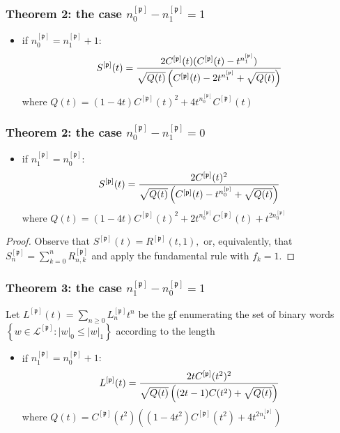 \documentclass{beamer}
\begin{document}
\begin{frame}\frametitle{Theorem 2: the case $n_0^{[\mathfrak{p}]}-n_1^{[\mathfrak{p}]}=1$}
\begin{itemize}
\item if $n_0^{[\mathfrak{p}]}=n_1^{[\mathfrak{p}]}+1:$
$$S^{[\mathfrak{p}]}(t)={2C^{[\mathfrak{p}]}(t)(C^{[\mathfrak{p}]}(t)-t^{n_1^{[\mathfrak{p}]}}
) \over \sqrt{Q(t)} \left(C^{[\mathfrak{p}]}(t)-2t^{n_1^{[\mathfrak{p}]}}+ \sqrt{Q(t)} \right) }$$
    where $Q(t)={ (1-4t)C^{[\mathfrak{p}]}(t)^2+4t^{n_0^{[\mathfrak{p}]}}C^{[\mathfrak{p}]}(t)}$
\end{itemize}
\end{frame}

\begin{frame}\frametitle{Theorem 2: the case $n_0^{[\mathfrak{p}]}-n_1^{[\mathfrak{p}]}=0$}
\begin{itemize}
\item if $n_1^{[\mathfrak{p}]}=n_0^{[\mathfrak{p}]}:$
$$S^{[\mathfrak{p}]}(t)={2C^{[\mathfrak{p}]}(t)^2 \over \sqrt{Q(t)}
    \left(C^{[\mathfrak{p}]}(t)-t^{n_0^{[\mathfrak{p}]}}+ \sqrt{Q(t)} \right) }$$
where $Q(t)=(1-4t)C^{[\mathfrak{p}]}(t)^2+2t^{n_0^{[\mathfrak{p}]}}C^{[\mathfrak{p}]}(t)+t^{2n_0^{[\mathfrak{p}]}}$
\end{itemize}

\begin{proof}
Observe that $S^{[\mathfrak{p}]}(t)=R^{[\mathfrak{p}]}(t,1),$ or, equivalently, that
$S_n^{[\mathfrak{p}]}=\sum_{k=0}^nR_{n, k}^{[\mathfrak{p}]}$ and apply the
fundamental rule with $f_k=1$.
\end{proof}
\end{frame}


\begin{frame}\frametitle{Theorem 3: the case $n_1^{[\mathfrak{p}]}-n_0^{[\mathfrak{p}]}=1$}
Let $L^{[\mathfrak{p}]}(t)=\sum_{n\geq 0}L_n^{[\mathfrak{p}]}t^n$ be the
gf enumerating the set of binary words $\left\lbrace
w\in\mathcal{L}^{[\mathfrak{p}]} : |w|_0\leq |w|_1\right\rbrace$ according to
the length

\begin{itemize}
\item if $n_1^{[\mathfrak{p}]}=n_0^{[\mathfrak{p}]}+1:$
$$L^{[\mathfrak{p}]}(t)= {2tC^{[\mathfrak{p}]}(t^2)^2 \over \sqrt{Q(t)}\left((2t-1)C(t^2)+ \sqrt{ Q(t) } \right)}$$
where $Q(t)=C^{[\mathfrak{p}]}(t^2)\left( (1-4t^2)C^{[\mathfrak{p}]}(t^2)+4t^{2n_1^{[\mathfrak{p}]}}\right)$
\end{itemize}
\end{frame}
\end{document}
